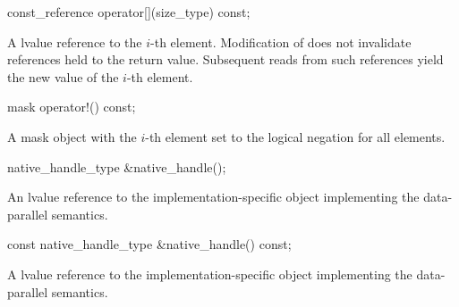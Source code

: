 \begin{wgText}
  \begin{itemdecl}
const_reference operator[](size_type) const;
  \end{itemdecl}
  \begin{itemdescr}
    \pnum\returns A \const lvalue reference to the $i$-th element.
    \pnum\postconditions Modification of  does not invalidate references held to the return value.
    Subsequent reads from such references yield the new value of the $i$-th element.
  \end{itemdescr}

  \begin{itemdecl}
mask operator!() const;
  \end{itemdecl}
  \begin{itemdescr}
    \pnum\returns A mask object with the $i$-th element set to the logical negation for all elements.
  \end{itemdescr}

  \begin{itemdecl}
native_handle_type &native_handle();
  \end{itemdecl}
  \begin{itemdescr}
    \pnum\returns An lvalue reference to the implementation-specific object implementing the data-parallel semantics.
  \end{itemdescr}

  \begin{itemdecl}
const native_handle_type &native_handle() const;
  \end{itemdecl}
  \begin{itemdescr}
    \pnum\returns A \const lvalue reference to the implementation-specific object implementing the data-parallel semantics.
  \end{itemdescr}


\end{wgText}
